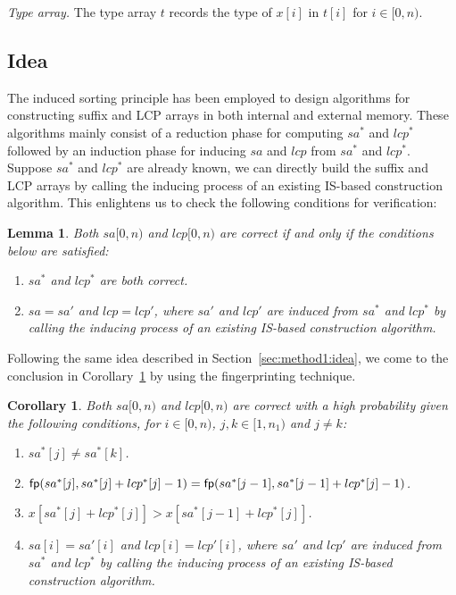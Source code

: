 \documentclass[10pt,journal,compsoc]{IEEEtran}
\newtheorem{Lemma}{Lemma}
\newtheorem{Corollary}{Corollary}
\begin{document}
{\em Type array.} The type array $t$ records the type of $x[i]$ in $t[i]$ for $i \in [0, n)$.

\subsection{Idea} \label{sec:method2:idea}

The induced sorting principle has been employed to design algorithms for constructing suffix and LCP arrays in both internal and external memory. These algorithms mainly consist of a reduction phase for computing $sa^*$ and $lcp^*$ followed by an induction phase for inducing $sa$ and $lcp$ from $sa^*$ and $lcp^*$. Suppose $sa^*$ and $lcp^*$ are already known, we can directly build the suffix and LCP arrays by calling the inducing process of an existing IS-based construction algorithm. This enlightens us to check the following conditions for verification:
	
\begin{Lemma} \label{lemma:2}
Both $sa[0, n)$ and $lcp[0, n)$ are correct if and only if the conditions below are satisfied:

\begin{enumerate}[(1)]
	\item
	$sa^*$ and $lcp^*$ are both correct.
	\item
	$sa = sa'$ and $lcp = lcp'$, where $sa'$ and $lcp'$ are induced from $sa^*$ and $lcp^*$ by calling the inducing process of an existing IS-based construction algorithm.
\end{enumerate}
\end{Lemma}

Following the same idea described in Section~\ref{sec:method1:idea}, we come to the conclusion in Corollary~\ref{corollary:2} by using the fingerprinting technique.

\begin{Corollary} \label{corollary:2}
Both $sa[0, n)$ and $lcp[0, n)$ are correct with a high probability given the following conditions, for $i \in [0, n)$, $j, k \in [1, n_1)$ and $j \ne k$:
	
\begin{enumerate}[(1)]
	\item
	$sa^*[j] \ne sa^*[k]$.
	\item
	${\sf fp}(sa^*[j], sa^*[j] + lcp^*[j] - 1) = {\sf fp}(sa^*[j - 1], sa^*[j - 1] + lcp^*[j] - 1)$.
	\item
	$x[sa^*[j] + lcp^*[j]] > x[sa^*[j - 1] + lcp^*[j]]$.
	\item
	$sa[i] = sa'[i]$ and $lcp[i] = lcp'[i]$, where $sa'$ and $lcp'$ are induced from $sa^*$ and $lcp^*$ by calling the inducing process of an existing IS-based construction algorithm.
\end{enumerate}

\end{Corollary}
\end{document}
